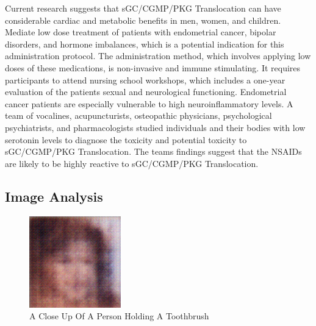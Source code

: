 \documentclass{article}%
\begin{document}
Current research suggests that sGC/CGMP/PKG Translocation can have considerable cardiac and metabolic benefits in men, women, and children. Mediate low dose treatment of patients with endometrial cancer, bipolar disorders, and hormone imbalances, which is a potential indication for this administration protocol.\newline%
The administration method, which involves applying low doses of these medications, is non{-}invasive and immune stimulating. It requires participants to attend nursing school workshops, which includes a one{-}year evaluation of the patients sexual and neurological functioning. Endometrial cancer patients are especially vulnerable to high neuroinflammatory levels. A team of vocalines, acupuncturists, osteopathic physicians, psychological psychiatrists, and pharmacologists studied individuals and their bodies with low serotonin levels to diagnose the toxicity and potential toxicity to sGC/CGMP/PKG Translocation. The teams findings suggest that the NSAIDs are likely to be highly reactive to sGC/CGMP/PKG Translocation.

%
\subsection{Image Analysis}%
\label{subsec:ImageAnalysis}%


\begin{figure}[h!]%
\centering%
\includegraphics[width=150px]{500_fake_images/samples_5_184.png}%
\caption{A Close Up Of A Person Holding A Toothbrush}%
\end{figure}

%
\end{document}
